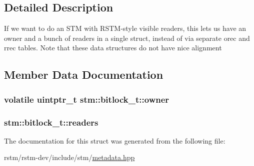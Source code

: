 \subsection{Detailed Description}
If we want to do an S\-T\-M with R\-S\-T\-M-\/style visible readers, this lets us have an owner and a bunch of readers in a single struct, instead of via separate orec and rrec tables. Note that these data structures do not have nice alignment 

\subsection{Member Data Documentation}
\hypertarget{structstm_1_1bitlock__t_a9998628fab8ea8149e6e3b257cee4c9e}{
\subsubsection[{owner}]{\setlength{\rightskip}{0pt plus 5cm}volatile uintptr\-\_\-t stm\-::bitlock\-\_\-t\-::owner}}\label{structstm_1_1bitlock__t_a9998628fab8ea8149e6e3b257cee4c9e}
\hypertarget{structstm_1_1bitlock__t_ae76a58d0e8960026d49917e1e8f901e8}{
\subsubsection[{readers}]{ stm\-::bitlock\-\_\-t\-::readers}}\label{structstm_1_1bitlock__t_ae76a58d0e8960026d49917e1e8f901e8}


The documentation for this struct was generated from the following file\-:\begin{DoxyCompactItemize}
\item 
rstm/rstm-\/dev/include/stm/\hyperlink{metadata_8hpp}{metadata.\-hpp}\end{DoxyCompactItemize}
